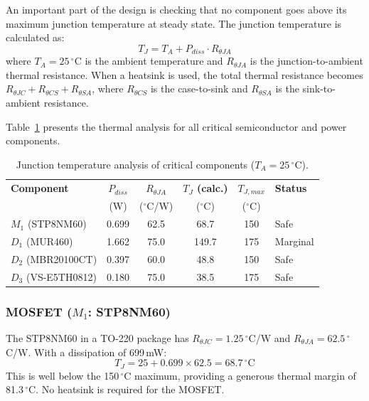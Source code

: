 An important part of the design is checking that no component goes above its maximum junction temperature at steady state. The junction temperature is calculated as:
\begin{equation}
T_J = T_A + P_{diss} \cdot R_{\theta JA}
\end{equation}
where $T_A = 25\,^\circ$C is the ambient temperature and $R_{\theta JA}$ is the junction-to-ambient thermal resistance. When a heatsink is used, the total thermal resistance becomes $R_{\theta JC} + R_{\theta CS} + R_{\theta SA}$, where $R_{\theta CS}$ is the case-to-sink and $R_{\theta SA}$ is the sink-to-ambient resistance.

Table~\ref{tab:thermal} presents the thermal analysis for all critical semiconductor and power components.

\begin{table}[H]
\centering
\caption{Junction temperature analysis of critical components ($T_A = 25\,^\circ$C).}
\label{tab:thermal}
\begin{tabular}{lccccl}
\toprule
\textbf{Component} & \textbf{$P_{diss}$} & \textbf{$R_{\theta JA}$} & \textbf{$T_J$ (calc.)} & \textbf{$T_{J,max}$} & \textbf{Status} \\
 & (W) & ($^\circ$C/W) & ($^\circ$C) & ($^\circ$C) & \\
\midrule
$M_1$ (STP8NM60) & 0.699 & 62.5 & 68.7 & 150 & Safe \\
$D_1$ (MUR460) & 1.662 & 75.0 & 149.7 & 175 & Marginal \\
$D_2$ (MBR20100CT) & 0.397 & 60.0 & 48.8 & 150 & Safe \\
$D_3$ (VS-E5TH0812) & 0.180 & 75.0 & 38.5 & 175 & Safe \\
\bottomrule
\end{tabular}
\end{table}

\subsubsection*{MOSFET ($M_1$: STP8NM60)}
The STP8NM60 in a TO-220 package has $R_{\theta JC} = 1.25\,^\circ$C/W and $R_{\theta JA} = 62.5\,^\circ$C/W. With a dissipation of 699\,mW:
\begin{equation}
T_J = 25 + 0.699 \times 62.5 = 68.7\,^\circ\text{C}
\end{equation}
This is well below the 150$\,^\circ$C maximum, providing a generous thermal margin of 81.3$\,^\circ$C. No heatsink is required for the MOSFET.

